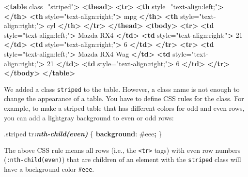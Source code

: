 \documentclass[
  11pt,
]{krantz}
\newenvironment{Shaded}{\begin{snugshade}}{\end{snugshade}}
\newcommand{\ConstantTok}[1]{\textcolor[rgb]{0,0,0}{#1}}
\newcommand{\FunctionTok}[1]{\textcolor[rgb]{0,0,0}{#1}}
\newcommand{\InformationTok}[1]{\textcolor[rgb]{0.37,0.37,0.37}{\textbf{\textit{#1}}}}
\newcommand{\KeywordTok}[1]{\textcolor[rgb]{0.27,0.27,0.27}{\textbf{#1}}}
\newcommand{\NormalTok}[1]{#1}
\newcommand{\OperatorTok}[1]{\textcolor[rgb]{0.43,0.43,0.43}{\textbf{#1}}}
\newcommand{\OtherTok}[1]{\textcolor[rgb]{0.37,0.37,0.37}{#1}}
\newcommand{\StringTok}[1]{\textcolor[rgb]{0.5,0.5,0.5}{#1}}
\begin{document}
\begin{Shaded}
\begin{Highlighting}[]
\KeywordTok{<table}\OtherTok{ class=}\StringTok{"striped"}\KeywordTok{>}
 \KeywordTok{<thead>}
  \KeywordTok{<tr>}
   \KeywordTok{<th}\OtherTok{ style=}\StringTok{"text-align:left;"}\KeywordTok{>}   \KeywordTok{</th>}
   \KeywordTok{<th}\OtherTok{ style=}\StringTok{"text-align:right;"}\KeywordTok{>}\NormalTok{ mpg }\KeywordTok{</th>}
   \KeywordTok{<th}\OtherTok{ style=}\StringTok{"text-align:right;"}\KeywordTok{>}\NormalTok{ cyl }\KeywordTok{</th>}
  \KeywordTok{</tr>}
 \KeywordTok{</thead>}
\KeywordTok{<tbody>}
  \KeywordTok{<tr>}
   \KeywordTok{<td}\OtherTok{ style=}\StringTok{"text-align:left;"}\KeywordTok{>}\NormalTok{ Mazda RX4 }\KeywordTok{</td>}
   \KeywordTok{<td}\OtherTok{ style=}\StringTok{"text-align:right;"}\KeywordTok{>}\NormalTok{ 21 }\KeywordTok{</td>}
   \KeywordTok{<td}\OtherTok{ style=}\StringTok{"text-align:right;"}\KeywordTok{>}\NormalTok{ 6 }\KeywordTok{</td>}
  \KeywordTok{</tr>}
  \KeywordTok{<tr>}
   \KeywordTok{<td}\OtherTok{ style=}\StringTok{"text-align:left;"}\KeywordTok{>}\NormalTok{ Mazda RX4 Wag }\KeywordTok{</td>}
   \KeywordTok{<td}\OtherTok{ style=}\StringTok{"text-align:right;"}\KeywordTok{>}\NormalTok{ 21 }\KeywordTok{</td>}
   \KeywordTok{<td}\OtherTok{ style=}\StringTok{"text-align:right;"}\KeywordTok{>}\NormalTok{ 6 }\KeywordTok{</td>}
  \KeywordTok{</tr>}
\KeywordTok{</tbody>}
\KeywordTok{</table>}
\end{Highlighting}
\end{Shaded}

We added a class \texttt{striped} to the table. However, a class name is not enough to change the appearance of a table. You have to define CSS rules for the class. For example, to make a striped table that has different colors for odd and even rows, you can add a lightgray background to even or odd rows:

\begin{Shaded}
\begin{Highlighting}[]
\FunctionTok{.striped}\NormalTok{ tr}\InformationTok{:nth-child(even)}\NormalTok{ \{ }\KeywordTok{background}\NormalTok{: }\ConstantTok{#eee}\OperatorTok{;}\NormalTok{ \}}
\end{Highlighting}
\end{Shaded}

The above CSS rule means all rows (i.e., the \texttt{\textless{}tr\textgreater{}} tags) with even row numbers (\texttt{:nth-child(even)}) that are children of an element with the \texttt{striped} class will have a background color \texttt{\#eee}.
\end{document}
